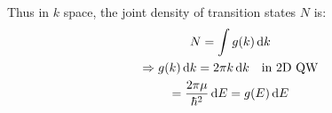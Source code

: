 \begin{parts}
	Thus in $k$ space, the joint density of transition states $N$ is:
	\begin{gather*}
		N = \int g(k) \, \mathrm{d}k \\
		\Rightarrow g(k) \, \mathrm{d}k = 2\pi k \, \mathrm{d}k \textnormal{\hspace{1em}in 2D QW} \\
		= \frac{2\pi\mu}{\hbar^2} \, \mathrm{d}E = g(E) \, \mathrm{d}E
	\end{gather*}
\end{parts}
